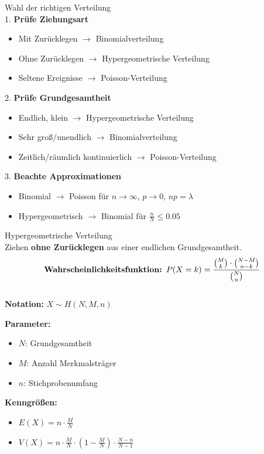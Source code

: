 \begin{KR}{Wahl der richtigen Verteilung}\\
1. \textbf{Prüfe Ziehungsart}
   \begin{itemize}
   \item Mit Zurücklegen $\rightarrow$ Binomialverteilung
   \item Ohne Zurücklegen $\rightarrow$ Hypergeometrische Verteilung
   \item Seltene Ereignisse $\rightarrow$ Poisson-Verteilung
   \end{itemize}

2. \textbf{Prüfe Grundgesamtheit}
   \begin{itemize}
   \item Endlich, klein $\rightarrow$ Hypergeometrische Verteilung
   \item Sehr groß/unendlich $\rightarrow$ Binomialverteilung
   \item Zeitlich/räumlich kontinuierlich $\rightarrow$ Poisson-Verteilung
   \end{itemize}

3. \textbf{Beachte Approximationen}
   \begin{itemize}
   \item Binomial $\rightarrow$ Poisson für $n \to \infty$, $p \to 0$, $np = \lambda$
   \item Hypergeometrisch $\rightarrow$ Binomial für $\frac{n}{N} \leq 0.05$
   \end{itemize}
\end{KR}


\begin{definition}{Hypergeometrische Verteilung}\\
Ziehen \textbf{ohne Zurücklegen} aus einer endlichen Grundgesamtheit.
\vspace{-2mm}\\
$$\text{\textbf{Wahrscheinlichkeitsfunktion: }}P(X=k) = \frac{\binom{M}{k} \cdot \binom{N-M}{n-k}}{\binom{N}{n}}$$
\vspace{-4mm}\\
\textbf{Notation:} $X \sim H(N,M,n)$

\begin{minipage}[t]{0.5\textwidth}
\textbf{Parameter:}
\begin{itemize}
    \item $N$: Grundgesamtheit
    \item $M$: Anzahl Merkmalsträger
    \item $n$: Stichprobenumfang
\end{itemize}
\end{minipage}
\begin{minipage}[t]{0.5\textwidth}
\textbf{Kenngrößen:}
\begin{itemize}
    \item $E(X) = n \cdot \frac{M}{N}$
    \item $V(X) = n \cdot \frac{M}{N} \cdot (1-\frac{M}{N}) \cdot \frac{N-n}{N-1}$
\end{itemize}
\end{minipage}
\end{definition}

